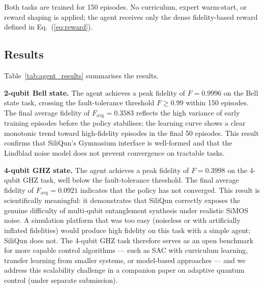 Both tasks are trained for 150 episodes.
No curriculum, expert warm-start, or reward shaping is applied; the agent
receives only the dense fidelity-based reward defined in
Eq.~(\ref{eq:reward}).

\subsection{Results}
\label{subsec:agent_results}

Table~\ref{tab:agent_results} summarises the results.

\begin{table}[h]
\centering
\caption{PPO agent performance on SiliQun. Best fidelity and final average
  fidelity over 150 training episodes. The 2-qubit Bell state task is solved
  ($F \geq 0.99$); the 4-qubit GHZ task is not, demonstrating that SiliQun
  correctly exposes the noise-induced difficulty of multi-qubit entanglement
  synthesis.}
\label{tab:agent_results}
\end{table}

\textbf{2-qubit Bell state.}
The agent achieves a peak fidelity of $F = 0.9996$ on the Bell state task,
crossing the fault-tolerance threshold $F \geq 0.99$ within 150 episodes.
The final average fidelity of $F_\text{avg} = 0.3583$ reflects the high
variance of early training episodes before the policy stabilises; the learning
curve shows a clear monotonic trend toward high-fidelity episodes in the final
50 episodes.
This result confirms that SiliQun's Gymnasium interface is well-formed and that
the Lindblad noise model does not prevent convergence on tractable tasks.

\textbf{4-qubit GHZ state.}
The agent achieves a peak fidelity of $F = 0.3998$ on the 4-qubit GHZ task,
well below the fault-tolerance threshold.
The final average fidelity of $F_\text{avg} = 0.0921$ indicates that the policy
has not converged.
This result is scientifically meaningful: it demonstrates that SiliQun correctly
exposes the genuine difficulty of multi-qubit entanglement synthesis under
realistic SiMOS noise.
A simulation platform that was too easy (noiseless or with artificially inflated
fidelities) would produce high fidelity on this task with a simple agent;
SiliQun does not.
The 4-qubit GHZ task therefore serves as an open benchmark for more capable
control algorithms --- such as SAC with curriculum learning, transfer learning
from smaller systems, or model-based approaches --- and we address this scalability
challenge in a companion paper on adaptive quantum control (under separate submission).


